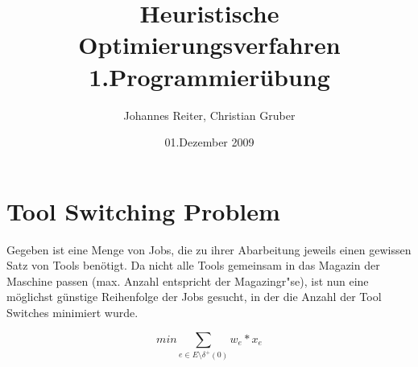 \documentclass[a4paper,10pt]{article}
\title{Heuristische Optimierungsverfahren \\ \bigskip \textbf{1.Programmier\"{u}bung}}
\author{Johannes Reiter, Christian Gruber}
\date{\vspace{1cm} 01.Dezember 2009}
\begin{document}
\maketitle

\section{Tool Switching Problem}
Gegeben ist eine Menge von Jobs, die zu ihrer Abarbeitung jeweils einen gewissen Satz von Tools ben\"{o}tigt.
Da nicht alle Tools gemeinsam in das Magazin der Maschine passen (max. Anzahl entspricht der Magazingr"se), ist
nun eine m\"{o}glichst g\"{u}nstige Reihenfolge der Jobs gesucht, in der die Anzahl der Tool Switches minimiert wurde.

\begin{equation}
min \sum_{e \in E \setminus \delta^{+}(0)} w_e * x_e 
\end{equation}
\end{document}
